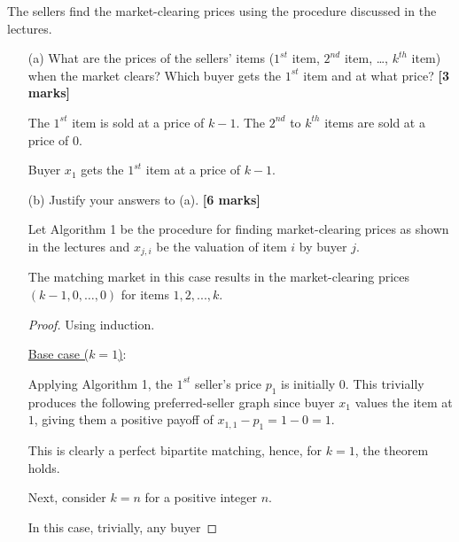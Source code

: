 \noindent The sellers find the market-clearing prices using the procedure discussed in the lectures.
\begin{enumerate}
    \item[(a)] What are the prices of the sellers' items ($1^{st}$ item, $2^{nd}$ item, \ldots, $k^{th}$ item) when the market clears? Which buyer gets the $1^{st}$ item and at what price?  \hfill{\bf [3 marks]}\smallskip

    The $1^{st}$ item is sold at a price of $k - 1$.
    The $2^{nd}$ to $k^{th}$ items are sold at a price of $0$.

    Buyer $x_1$ gets the $1^{st}$ item at a price of $k - 1$.

    \item[(b)] Justify your answers to (a).  \hfill{\bf [6 marks]}\smallskip

    Let Algorithm 1 be the procedure for finding market-clearing prices as shown in the lectures and $x_{j,i}$ be the valuation of item $i$ by buyer $j$.

    \begin{theorem}
        The matching market in this case results in the market-clearing prices $(k - 1, 0, \dots, 0)$ for items $1, 2, ..., k$.
    \end{theorem}

    \begin{proof}
        Using induction.

        \underline{Base case ($k = 1$)}:
    
        Applying Algorithm 1, the $1^{st}$ seller's price $p_1$ is initially $0$.
        This trivially produces the following preferred-seller graph since buyer $x_1$ values the item at $1$, giving them a positive payoff of $x_{1,1} - p_1 = 1 - 0 = 1$.

        \hfil
        \hfil

        This is clearly a perfect bipartite matching, hence, for $k = 1$, the theorem holds.

        Next, consider $k = n$ for a positive integer $n$.

        In this case, trivially, any buyer 


\end{proof}
\end{enumerate}
